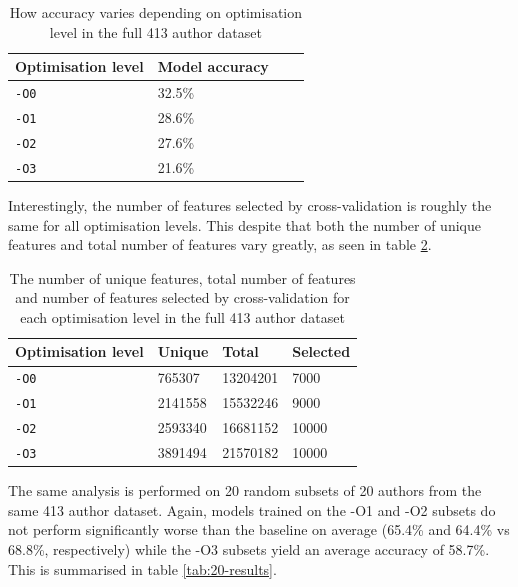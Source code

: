 \documentclass[a4paper,11pt]{kth-mag}
\begin{document}
\begin{table}[!htb]
    \centering
    \caption{How accuracy varies depending on optimisation level in the full
    413 author dataset}
        \begin{tabular}{ l l l l }
        Optimisation level & Model accuracy \\
        \hline
        \lstinline{-O0} & 32.5\% \\
        \lstinline{-O1} & 28.6\% \\
        \lstinline{-O2} & 27.6\% \\
        \lstinline{-O3} & 21.6\%
        \end{tabular}

    \label{tab:413-results}
\end{table}

Interestingly, the number of features selected by cross-validation is roughly
the same for all optimisation levels. This despite that both the number of
unique features and total number of features vary greatly, as seen in table
\ref{tab:413-results-features}.

\begin{table}[!htb]
    \centering
    \caption{The number of unique features, total number of features and number
    of features selected by cross-validation for each optimisation level in the
    full 413 author dataset}
        \begin{tabular}{ l l l l }
        Optimisation level & Unique & Total & Selected \\ \hline
        \lstinline{-O0} & 765307 & 13204201 & 7000 \\
        \lstinline{-O1} & 2141558 & 15532246 & 9000 \\
        \lstinline{-O2} & 2593340 & 16681152 & 10000 \\
        \lstinline{-O3} & 3891494 & 21570182 & 10000
        \end{tabular}
        \label{tab:413-results-features}
\end{table}

The same analysis is performed on 20 random subsets of 20 authors from the same
413 author dataset. Again, models trained on the -O1 and -O2 subsets do not
perform significantly worse than the baseline on average (65.4\% and 64.4\%
vs 68.8\%, respectively) while the -O3 subsets yield an average accuracy of
58.7\%. This is summarised in table \ref{tab:20-results}.
\end{document}
